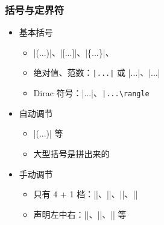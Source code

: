 \begin{frame}[fragile]
\frametitle{括号与定界符}
\begin{itemize}
  \item<+-> 基本括号

    \begin{itemize}
      \item |(...)|、|[...]|、|\{...\}|、
      \item 绝对值、范数：\lstinline[style=style@inline]+|...|+ 或 |\vert...\vert|、|\Vert...\Vert|
      \item Dirac 符号：|\langle...\rangle|、\lstinline[style=style@inline]+|...\rangle+
    \end{itemize}

  \item<+-> 自动调节

    \begin{itemize}
      \item |\left(...\right)| 等
      \item 大型括号是拼出来的
    \end{itemize}

  \item<+-> 手动调节

    \begin{itemize}
      \item 只有 4 + 1 档：|\big|、|\Big|、|\bigg|、|\Bigg|
      \item 声明左中右：|\bigl|、|\bigm|、|\bigr| 等
    \end{itemize}
\end{itemize}
\end{frame}

